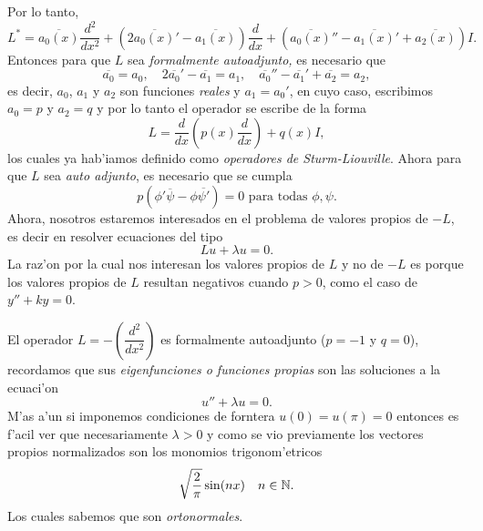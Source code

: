 \documentclass[main.tex]{subfiles}
\begin{document}
Por lo tanto,
\[
  L^{*}=\overline{a_0(x)}\frac{d^2}{dx^2}+(2\overline{a_{0}(x)}'-\overline{a_1(x)})\frac{d}{dx}+(\overline{a_{0}(x)}''-\overline{a_{1}(x)}'+\overline{a_2(x)})I.
\]
Entonces para que $L$ sea \emph{formalmente autoadjunto,} es necesario que
\[
  \overline{a_{0}}=a_{0},\quad 2\overline{a_{0}}'-\overline{a_{1}}=a_{1},\quad\overline{a_{0}}''-\overline{a_{1}}'+\overline{a_{2}}=a_{2},
\]
es decir, $a_{0}$, $a_{1}$ y $a_{2}$ son funciones \emph{reales} y $a_{1}=a_{0}'$, en cuyo caso, escribimos $a_{0}=p$ y $a_{2}=q$ y por lo tanto el operador se escribe de la forma
\[
    L=\frac{d}{dx} \left( p(x) \dfrac{d}{dx} \right) + q(x)I,
\]
los cuales ya hab'iamos definido como \emph{operadores de Sturm-Liouville}. Ahora para que $L$ sea \emph{auto adjunto}, es necesario que se cumpla
\[
  p(\phi'\overline{\psi}-\phi\overline{\psi'})=0\text{ para todas }\phi,\psi.
\]
Ahora, nosotros estaremos interesados en el problema de valores propios de $-L$, es decir en resolver ecuaciones del tipo
\[
  Lu+\lambda u=0.
\]
La raz'on por la cual nos interesan los valores propios de $L$ y no de $-L$ es porque los valores propios de $L$ resultan negativos cuando $p>0$, como el caso de $y''+ky=0$.

\eje El operador $L=-(\dfrac{d^{2}}{dx^{2}})$ es formalmente autoadjunto ($p=-1$ y $q=0$), recordamos que sus \emph{eigenfunciones o funciones propias} son las soluciones a la ecuaci'on
\[
  u''+\lambda u=0.
\]
M'as a'un si imponemos condiciones de forntera $u(0)=u(\pi)=0$ entonces es f'acil ver que necesariamente $\lambda>0$ y como se vio previamente los vectores propios normalizados son los monomios trigonom'etricos
\[
  \sqrt{\frac{2}{\pi}}\sin(nx)\quad n\in \mathbb N .
\]
Los cuales sabemos que son \emph{ortonormales}.
\end{document}
